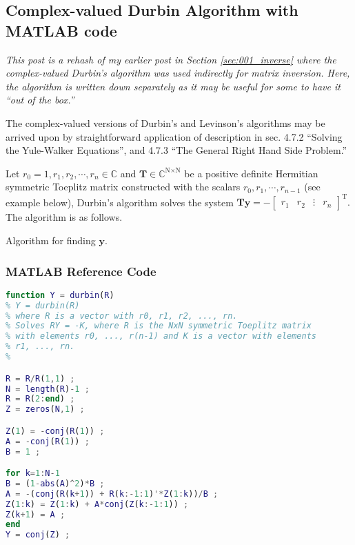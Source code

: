 \subsection{Complex-valued Durbin Algorithm with MATLAB code}

\emph{This post is a rehash of my earlier post in Section \ref{sec:001_inverse} where the complex-valued Durbin's algorithm was used indirectly for matrix inversion. Here, the algorithm is written down separately as it may be useful for some to have it ``out of the box.''}

The complex-valued versions of Durbin's and Levinson's algorithms may be arrived upon by straightforward application of description in \cite{Golub2012} sec. 4.7.2 ``Solving the Yule-Walker Equations'', and 4.7.3 ``The General Right Hand Side Problem.''

Let $r_0 = 1, r_1, r_2, \cdots, r_n \in \mathbb{C}$ and $\boldsymbol{T} \in \mathbb{C}^{\text{N}\times\text{N}}$ be a positive definite Hermitian symmetric Toeplitz matrix constructed with the scalars $r_0, r_1, \cdots, r_{n-1}$ (see example below), Durbin's algorithm solves the system $\boldsymbol{T} \boldsymbol{y} = - \begin{bmatrix}r_1 & r_2 & \vdots & r_n\end{bmatrix}^\mathrm{T}.$ The algorithm is as follows.

\begin{algorithm}[H]
\caption{Algorithm for finding $\boldsymbol{y}.$}
\begin{algorithmic}[1]
\EndFor
{}
\end{algorithmic}
\end{algorithm}

\subsubsection{MATLAB Reference Code}
\begin{lstlisting}[language=MATLAB,numbers=none]
function Y = durbin(R)
% Y = durbin(R)
% where R is a vector with r0, r1, r2, ..., rn.
% Solves RY = -K, where R is the NxN symmetric Toeplitz matrix 
% with elements r0, ..., r(n-1) and K is a vector with elements
% r1, ..., rn.
%

R = R/R(1,1) ;
N = length(R)-1 ;
R = R(2:end) ;
Z = zeros(N,1) ;

Z(1) = -conj(R(1)) ;
A = -conj(R(1)) ;
B = 1 ;

for k=1:N-1
B = (1-abs(A)^2)*B ;
A = -(conj(R(k+1)) + R(k:-1:1)'*Z(1:k))/B ;
Z(1:k) = Z(1:k) + A*conj(Z(k:-1:1)) ;
Z(k+1) = A ;
end
Y = conj(Z) ;
\end{lstlisting}

